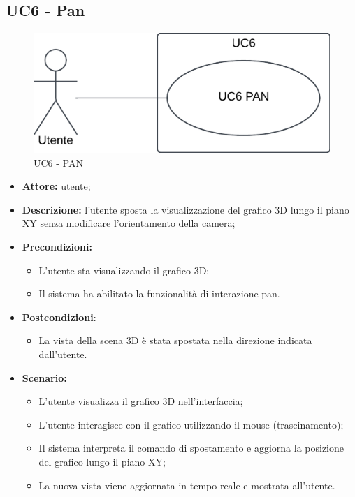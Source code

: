 \subsection{UC6 - Pan}
\begin{figure}[h!]
    \centering
    \includegraphics[scale=0.7]{template/images/UC6.png}
    \caption{UC6 - PAN}
\end{figure}
\begin{itemize}
    \item \textbf{Attore:} utente;
    \item \textbf{Descrizione:} l'utente sposta la visualizzazione del grafico 3D lungo il piano XY senza modificare l'orientamento della camera;
    \item \textbf{Precondizioni:}
    \begin{itemize}
        \item L'utente sta visualizzando il grafico 3D;
        \item Il sistema ha abilitato la funzionalità di interazione pan.
    \end{itemize}
    \item \textbf{Postcondizioni}:
    \begin{itemize}
        \item La vista della scena 3D è stata spostata nella direzione indicata dall'utente.
    \end{itemize}
    \item \textbf{Scenario:}
    \begin{itemize}
        \item L'utente visualizza il grafico 3D nell'interfaccia;
        \item L'utente interagisce con il grafico utilizzando il mouse (trascinamento);
        \item Il sistema interpreta il comando di spostamento e aggiorna la posizione del grafico lungo il piano XY;
        \item La nuova vista viene aggiornata in tempo reale e mostrata all'utente.
    \end{itemize}
\end{itemize}
